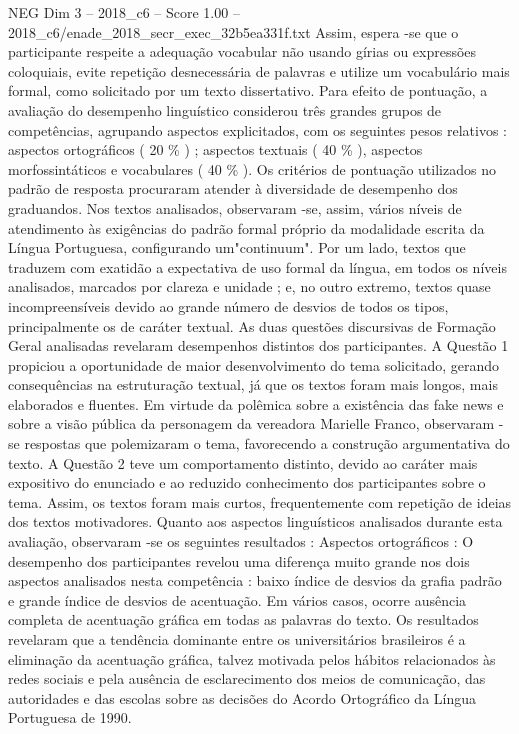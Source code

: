\begin{textsample}{NEG Dim 3 – 2018\_c6 – Score 1.00 – 2018\_c6/enade\_2018\_secr\_exec\_32b5ea331f.txt}
Assim, espera -se que o participante respeite a adequação vocabular não usando gírias ou expressões coloquiais, evite repetição desnecessária de palavras e utilize um vocabulário mais formal, como solicitado por um texto dissertativo.
Para efeito de pontuação, a avaliação do desempenho linguístico considerou três grandes grupos de competências, agrupando aspectos explicitados, com os seguintes pesos relativos : aspectos ortográficos ( 20 \% ) ; aspectos textuais ( 40 \% ), aspectos morfossintáticos e vocabulares ( 40 \% ).
Os critérios de pontuação utilizados no padrão de resposta procuraram atender à diversidade de desempenho dos graduandos.
Nos textos analisados, observaram -se, assim, vários níveis de atendimento às exigências do padrão formal próprio da modalidade escrita da Língua Portuguesa, configurando um"continuum".
Por um lado, textos que traduzem com exatidão a expectativa de uso formal da língua, em todos os níveis analisados, marcados por clareza e unidade ; e, no outro extremo, textos quase incompreensíveis devido ao grande número de desvios de todos os tipos, principalmente os de caráter textual.
As duas questões discursivas de Formação Geral analisadas revelaram desempenhos distintos dos participantes.
A Questão 1 propiciou a oportunidade de maior desenvolvimento do tema solicitado, gerando consequências na estruturação textual, já que os textos foram mais longos, mais elaborados e fluentes.
Em virtude da polêmica sobre a existência das fake news e sobre a visão pública da personagem da vereadora Marielle Franco, observaram -se respostas que polemizaram o tema, favorecendo a construção argumentativa do texto.
A Questão 2 teve um comportamento distinto, devido ao caráter mais expositivo do enunciado e ao reduzido conhecimento dos participantes sobre o tema.
Assim, os textos foram mais curtos, frequentemente com repetição de ideias dos textos motivadores.
Quanto aos aspectos linguísticos analisados durante esta avaliação, observaram -se os seguintes resultados : Aspectos ortográficos : O desempenho dos participantes revelou uma diferença muito grande nos dois aspectos analisados nesta competência : baixo índice de desvios da grafia padrão e grande índice de desvios de acentuação.
Em vários casos, ocorre ausência completa de acentuação gráfica em todas as palavras do texto.
Os resultados revelaram que a tendência dominante entre os universitários brasileiros é a eliminação da acentuação gráfica, talvez motivada pelos hábitos relacionados às redes sociais e pela ausência de esclarecimento dos meios de comunicação, das autoridades e das escolas sobre as decisões do Acordo Ortográfico da Língua Portuguesa de 1990.

\end{textsample}
